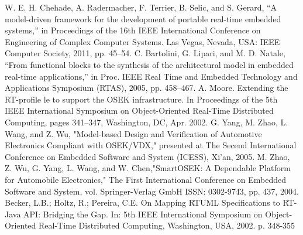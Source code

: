 \documentclass[runningheads,a4paper]{llncs}
\begin{document}
\begin{thebibliography}{4}
 W. E. H. Chehade, A. Radermacher, F. Terrier, B. Selic, and S. Gerard, “A model-driven framework for the development of portable real-time embedded systems,” in Proceedings of the 16th IEEE International Conference on Engineering of Complex Computer Systems. Las Vegas, Nevada, USA: IEEE Computer Society, 2011, pp. 45–54.
 C. Bartolini, G. Lipari, and M. D. Natale, “From functional blocks to the synthesis of the architectural model
in embedded real-time applications,” in Proc. IEEE Real Time and Embedded Technology and Applications Symposium (RTAS), 2005, pp. 458–467.
 A. Moore. Extending the RT-proﬁle le to support the OSEK
infrastructure. In Proceedings of the 5th IEEE International Symposium on Object-Oriented Real-Time Distributed Computing, pages 341–347, Washington, DC, Apr. 2002.
G. Yang, M. Zhao, L. Wang, and Z. Wu, "Model-based Design and Verification of Automotive Electronics Compliant with OSEK/VDX," presented at The Secend International Conference on Embedded Software and System (ICESS), Xi'an, 2005.
 M. Zhao, Z. Wu, G. Yang, L. Wang, and W. Chen,"SmartOSEK: A Dependable Platform for Automobile Electronics," The First International Conference on Embedded Software and System, vol. Springer-Verlag GmbH ISSN: 0302-9743, pp. 437, 2004.
 Becker, L.B.; Holtz, R.; Pereira, C.E. On Mapping RTUML Specifications to RT-Java API: Bridging the Gap. In: 5th IEEE International Symposium on Object-Oriented Real-Time Distributed Computing, Washington, USA, 2002. p. 348-355








\end{thebibliography}
\end{document}
